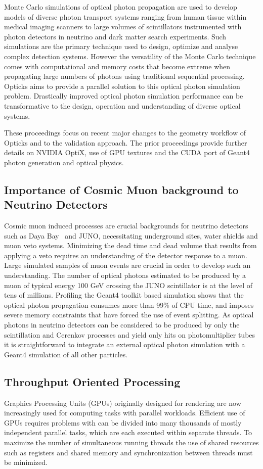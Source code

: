 \documentclass{webofc}
\begin{document}
Monte Carlo simulations of optical photon propagation 
are used to develop models of diverse photon transport systems 
ranging from human tissue within medical imaging scanners 
to large volumes of scintillators instrumented with photon detectors in neutrino 
and dark matter search experiments. 
Such simulations are the primary technique used to design, optimize 
and analyse complex detection systems. However the versatility 
of the Monte Carlo technique comes with computational and memory costs 
that become extreme when propagating large numbers of photons
using traditional sequential processing. Opticks aims to provide a 
parallel solution to this optical photon simulation problem.  Drastically 
improved optical photon simulation performance can be transformative 
to the design, operation and understanding of diverse optical systems.

These proceedings focus on recent major changes to the geometry workflow of Opticks 
and to the validation approach. The prior proceedings\cite{chep2016} provide further
details on NVIDIA OptiX, use of GPU textures and the CUDA port of Geant4 photon generation 
and optical physics.
%
\subsection{Importance of Cosmic Muon background to Neutrino Detectors}
%
Cosmic muon induced processes are crucial backgrounds for neutrino
detectors such as Daya Bay~\cite{dyb} and JUNO\cite{juno},
necessitating underground sites, water shields and muon veto systems.
Minimizing the dead time and dead volume that results from applying
a veto requires an understanding of the detector response to a muon.
Large simulated samples of muon events are crucial in order to
develop such an understanding.
%
The number of optical photons estimated to be produced by a muon of
typical energy 100 GeV crossing the JUNO scintillator is at the level of tens of millions.
Profiling the Geant4 toolkit based simulation shows that the optical photon propagation 
consumes more than 99\% of CPU time, and imposes severe memory constraints that have forced
the use of event splitting.  
%
As optical photons in neutrino detectors can be considered to be produced
by only the scintillation and Cerenkov processes and yield only hits
on photomultiplier tubes it is straightforward to integrate an
external optical photon simulation with a Geant4 simulation of all other particles.
%
\subsection{Throughput Oriented Processing}
%
Graphics Processing Units (GPUs) originally designed for rendering 
are now increasingly used for computing tasks with parallel workloads.
Efficient use of GPUs requires problems with can be divided into 
many thousands of mostly independent parallel tasks, which are 
each executed within separate threads. To maximize the number of simultaneous 
running threads the use of shared resources such as registers and shared 
memory and synchronization between threads must be minimized.
\end{document}

